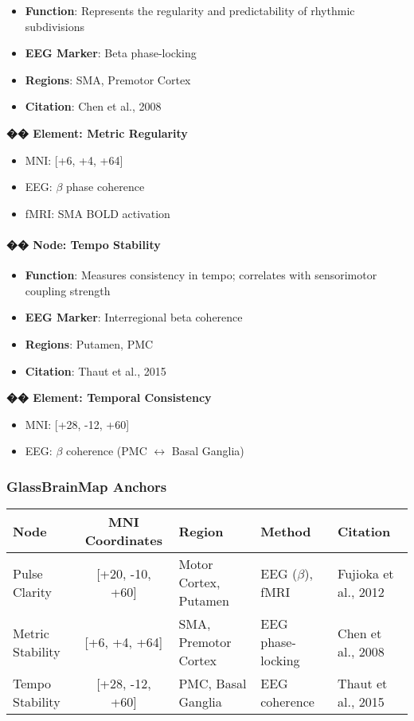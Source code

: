 \documentclass[10pt]{article}
\begin{document}
\begin{itemize}
    \item \textbf{Function}: Represents the regularity and predictability of rhythmic subdivisions
    \item \textbf{EEG Marker}: Beta phase-locking
    \item \textbf{Regions}: SMA, Premotor Cortex
    \item \textbf{Citation}: Chen et al., 2008
\end{itemize}

\textbf{�� Element: Metric Regularity}

\begin{itemize}
    \item MNI: [+6, +4, +64]
    \item EEG: $\beta$ phase coherence
    \item fMRI: SMA BOLD activation
\end{itemize}

\paragraph{�� Node: Tempo Stability}

\begin{itemize}
    \item \textbf{Function}: Measures consistency in tempo; correlates with sensorimotor coupling strength
    \item \textbf{EEG Marker}: Interregional beta coherence
    \item \textbf{Regions}: Putamen, PMC
    \item \textbf{Citation}: Thaut et al., 2015
\end{itemize}

\textbf{�� Element: Temporal Consistency}

\begin{itemize}
    \item MNI: [+28, -12, +60]
    \item EEG: $\beta$ coherence (PMC $\leftrightarrow$ Basal Ganglia)
\end{itemize}

\subsubsection*{GlassBrainMap Anchors}

\begin{center}
\begin{tabular}{|l|c|l|l|l|}
\hline
\textbf{Node} & \textbf{MNI Coordinates} & \textbf{Region} & \textbf{Method} & \textbf{Citation} \\
\hline
Pulse Clarity & [+20, -10, +60] & Motor Cortex, Putamen & EEG ($\beta$), fMRI & Fujioka et al., 2012 \\
Metric Stability & [+6, +4, +64] & SMA, Premotor Cortex & EEG phase-locking & Chen et al., 2008 \\
Tempo Stability & [+28, -12, +60] & PMC, Basal Ganglia & EEG coherence & Thaut et al., 2015 \\
\hline
\end{tabular}
\end{center}
\end{document}
